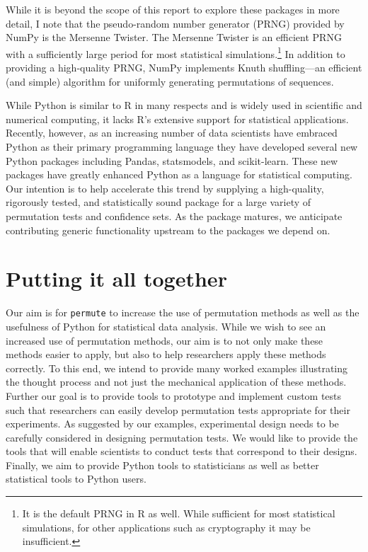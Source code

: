 While it is beyond the scope of this report to explore these packages in more
detail, I note that the pseudo-random number generator (PRNG) provided by NumPy
is the Mersenne Twister.  The Mersenne Twister is an efficient PRNG with a
sufficiently large period for most statistical simulations.\footnote{It is the
default PRNG in R as well.  While sufficient for most statistical simulations,
for other applications such as cryptography it may be insufficient.}  In
addition to providing a high-quality PRNG, NumPy implements Knuth
shuffling---an efficient (and simple) algorithm for uniformly generating
permutations of sequences.

While Python is similar to R in many respects and is widely used in scientific
and numerical computing, it lacks R's extensive support for statistical
applications.  Recently, however, as an increasing number of data scientists
have embraced Python as their primary programming language they have developed
several new Python packages including Pandas, statsmodels, and
scikit-learn.  These new packages have greatly enhanced Python as a language for
statistical computing.  Our intention is to help accelerate this trend by supplying a
high-quality, rigorously tested, and statistically sound package for a large
variety of permutation tests and confidence sets. As the package matures, we
anticipate contributing generic functionality upstream to the packages we
depend on.

\section{Putting it all together}

Our aim is for \texttt{permute} to increase the use of permutation methods
as well as the usefulness of Python for statistical data analysis.
While we wish to see an increased use of permutation methods, our aim is to not
only make these methods easier to apply, but also to help researchers
apply these methods correctly.  To this end, we intend to provide many worked
examples illustrating the thought process and not just the mechanical
application of these methods.  Further our goal is to provide tools to
prototype and implement custom tests such that researchers can easily develop
permutation tests appropriate for their experiments.  As suggested by our
examples, experimental design needs to be carefully considered in designing
permutation tests. We would like to provide the tools that will enable scientists
to conduct tests that correspond to their designs.  Finally, we aim to
provide Python tools to statisticians as well as better statistical tools to
Python users.
